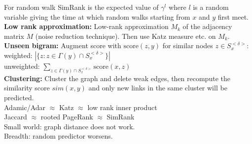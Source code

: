 For random walk SimRank is the expected value of $\gamma^l$ where $l$ is a random variable giving the time at which random walks starting from $x$ and $y$ first meet.\\
\textbf{Low rank approximation:} Low-rank approximation $M_k$ of the adjacency matrix $M$ (noise reduction technique). Then use Katz measure etc. on $M_k$.\\
\textbf{Unseen bigram:} Augment score with $\text{score}(z,y)$ for similar nodes $z \in S_x^{<\delta>}$:\\
weighted: $|\{ z : z \in \Gamma(y) \cap S_x^{<\delta>} \}|$\\
unweighted: $\sum_{z \in \Gamma(y) \cap S_x^{<\delta>}} \text{score}(x,z)$\\
\textbf{Clustering:} Cluster the graph and delete weak edges, then recompute the similarity score $sim(x,y)$ and only new links in the same cluster will be predicted.\\
Adamic/Adar $\approx$ Katz $\approx$ low rank inner product\\
Jaccard $\approx$ rooted PageRank $\approx$ SimRank\\
Small world: graph distance does not work.\\
Breadth: random predictor worsens.

